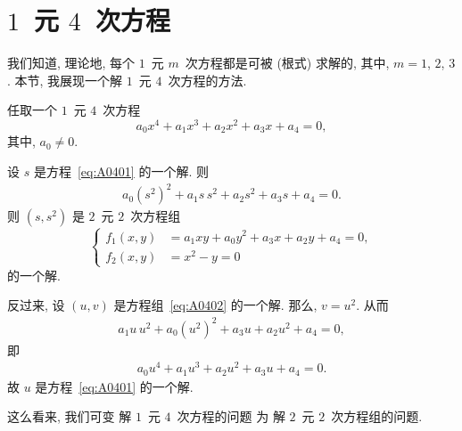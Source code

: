 \documentclass[../libro.tex]{subfiles}
\begin{document}
\section{\texorpdfstring{\(1\)~元 \(4\)~次方程}%
{1 元 4 次方程}}

我们知道, 理论地,
每个 \(1\)~元 \(m\)~次方程都是可被 (根式) 求解的,
其中, \(m = 1\), \(2\), \(3\).
本节, 我展现一个解 \(1\)~元 \(4\)~次方程的方法.

任取一个 \(1\)~元 \(4\)~次方程
\begin{equation}
    a_0 x^4 + a_1 x^3 + a_2 x^2 + a_3 x + a_4 = 0,
    \label{eq:A0401}
\end{equation}
其中, \(a_0 \neq 0\).

设 \(s\) 是方程~\eqref{eq:A0401} 的一个解.
则
\begin{align*}
    a_0 (s^2)^2 + a_1 s\, s^2 + a_2 s^2 + a_3 s + a_4 = 0.
\end{align*}
则 \((s, s^2)\) 是 \(2\)~元 \(2\)~次方程组
\begin{equation}
    \left\{ %
    \begin{aligned}
        f_1 (x, y) & = a_1 xy + a_0 y^2 + a_3 x + a_2 y + a_4 = 0, \\
        f_2 (x, y) & = x^2 - y = 0
    \end{aligned}
    \right. %
    \label{eq:A0402}
\end{equation}
的一个解.

反过来, 设 \((u, v)\) 是方程组~\eqref{eq:A0402} 的一个解.
那么, \(v = u^2\).
从而
\begin{align*}
    a_1 u\, u^2 + a_0 (u^2)^2 + a_3 u + a_2 u^2 + a_4 = 0,
\end{align*}
即
\begin{align*}
    a_0 u^4 + a_1 u^3 + a_2 u^2 + a_3 u + a_4 = 0.
\end{align*}
故 \(u\) 是方程~\eqref{eq:A0401} 的一个解.

这么看来, 我们可变%
解 \(1\)~元 \(4\)~次方程的问题%
为%
解 \(2\)~元 \(2\)~次方程组的问题.
\end{document}
